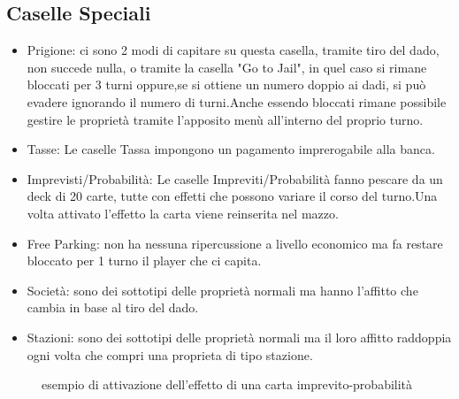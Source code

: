 \subsection{Caselle Speciali}
\begin{itemize}
    \item Prigione: ci sono 2 modi di capitare su questa casella, tramite tiro del dado, non succede nulla, o tramite la casella "Go to Jail", in quel caso si rimane bloccati per 3 turni oppure,\newline se si ottiene un numero doppio ai dadi, si può evadere ignorando il numero di turni.\newline Anche essendo bloccati rimane possibile gestire le proprietà tramite l'apposito menù all'interno del proprio turno.
    \item Tasse: Le caselle Tassa impongono un pagamento imprerogabile alla banca.
    \item Imprevisti/Probabilità: Le caselle Impreviti/Probabilità fanno pescare da un deck di 20 carte, tutte con effetti che possono variare il corso del turno.\newline Una volta attivato l'effetto la carta viene reinserita nel mazzo. 
    \item Free Parking: non ha nessuna ripercussione a livello economico ma fa restare bloccato per 1 turno il player che ci capita.
    \item Società: sono dei sottotipi delle proprietà normali ma hanno l'affitto che cambia in base al tiro del dado.
    \item Stazioni: sono dei sottotipi delle proprietà normali ma il loro affitto raddoppia ogni volta che compri una proprieta di tipo stazione.
\end{itemize}
\begin{figure}[H]
    \centering
    \caption{esempio di attivazione dell'effetto di una carta imprevito-probabilità}
	\label{img:gamescreen}
\end{figure}
